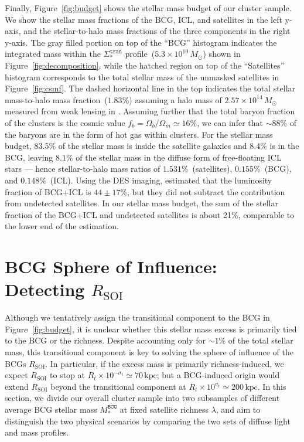 \documentclass[fleqn,usenatbib]{mnras}
\newcommand{\rsoi}{R_{\mathrm{SOI}}}
\newcommand{\sigtr}{\Sigma_*^{\texttt{tran}}}
\newcommand{\msbcg}{M_*^{\texttt{BCG}}}
\newcommand{\kpc}{\mathrm{kpc}}
\newcommand{\msol}{M_{\odot}}
\begin{document}
Finally, Figure~\ref{fig:budget} shows the stellar mass budget of our
cluster sample. We show the stellar mass fractions of the BCG, ICL, and
satellites in the left y-axis, and the stellar-to-halo mass fractions of the
three components in the right y-axis.  The gray filled portion on top of
the ``BCG'' histogram indicates
the integrated mass within the $\sigtr$ profile~($5.3{\times}10^{10}\,\msol$)
shown in Figure~\ref{fig:decomposition}, while the hatched region
on top of the ``Satellites'' histogram
corresponds to the total stellar mass of the unmasked satellites in Figure~\ref{fig:csmf}. The dashed
horizontal line in the top indicates the total stellar mass-to-halo mass
fraction~($1.83\%$) assuming a halo mass of $2.57{\times}10^{14}\,\msol$
measured from weak lensing in . Assuming further that
the total baryon fraction of the clusters is the cosmic value
$f_{b}{=}\Omega_{b}/\Omega_{m}{\simeq}16\%$, we can infer that
${\sim}88\%$ of the baryons are in the form of hot gas within clusters.
For the stellar mass budget, $83.5\%$ of the stellar mass is inside the
satellite galaxies and $8.4\%$ is in the BCG, leaving $8.1\%$ of the
stellar mass in the diffuse form of free-floating ICL stars --- hence
stellar-to-halo mass ratios of $1.531\%$~(satellites), $0.155\%$~(BCG), and
$0.148\%$~(ICL). Using the DES imaging, \citet{Zhang2019} estimated that
the luminosity fraction
of BCG+ICL is $44\pm17\%$, but they did not subtract the contribution from
undetected satellites. In our stellar mass budget, the sum of the stellar fraction
of the BCG+ICL and undetected satellites is about 21\%, comparable to the
lower end of the \citet{Zhang2019} estimation.




\section{BCG Sphere of Influence: Detecting \texorpdfstring{$\rsoi$}{Rsoi}}
\label{sec:soi}

Although we tentatively assign the transitional component to the BCG in
Figure~\ref{fig:budget}, it is unclear whether this stellar mass excess is
primarily tied to the BCG or the richness. Despite accounting
only for ${\sim}1\%$ of the total stellar mass, this transitional component is
key to solving the sphere of influence of the BCGs $\rsoi$. In particular,
if the excess mass is primarily richness-induced, we expect $\rsoi$ to stop
at $R_t{\times}10^{-\sigma_t}{\simeq}70\,\kpc$; but a BCG-induced origin
would extend $\rsoi$ beyond the transitional component at
$R_t{\times}10^{\sigma_t}{\simeq}200\,\kpc$. In this section, we divide our
overall cluster sample into two subsamples of different average BCG stellar
mass $\msbcg$ at fixed satellite richness $\lambda$, and aim to distinguish
the two physical scenarios by comparing the two sets of diffuse light and
mass profiles.
\end{document}
